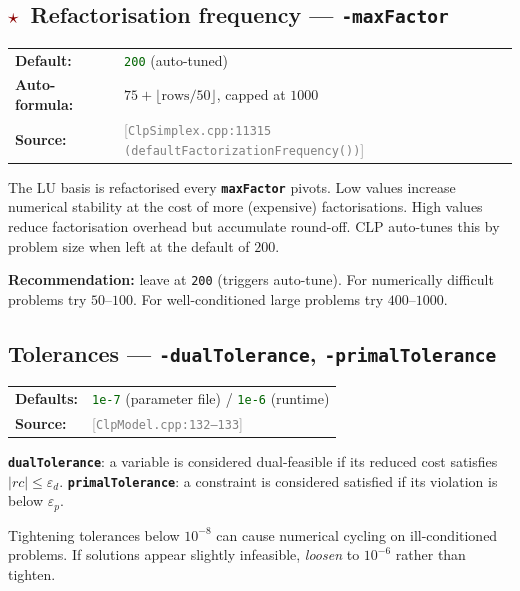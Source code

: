 \documentclass[11pt,a4paper]{article}
\newcommand{\param}[1]{\texttt{\textbf{#1}}}
\newcommand{\val}[1]{\texttt{#1}}
\newcommand{\src}[1]{\textcolor{gray}{\small[\texttt{#1}]}}
\newcommand{\default}[1]{\textcolor{darkgreen}{\texttt{#1}}}
\newcommand{\important}{\textcolor{darkred}{\textbf{$\star$}}}
\begin{document}
\subsection{\important\ Refactorisation frequency --- \param{-maxFactor}}

\begin{tabular}{@{}ll@{}}
  \textbf{Default:} & \default{200} (auto-tuned) \\
  \textbf{Auto-formula:} & $75 + \lfloor\text{rows}/50\rfloor$, capped at $1000$ \\
  \textbf{Source:}  & \src{ClpSimplex.cpp:11315 (defaultFactorizationFrequency())}
\end{tabular}

\medskip
The LU basis is refactorised every \param{maxFactor} pivots. Low values increase
numerical stability at the cost of more (expensive) factorisations. High values
reduce factorisation overhead but accumulate round-off.
CLP auto-tunes this by problem size when left at the default of $200$.

\begin{tipbox}
  \textbf{Recommendation:} leave at \val{200} (triggers auto-tune). For numerically
  difficult problems try $50$--$100$. For well-conditioned large problems try $400$--$1000$.
\end{tipbox}

\subsection{Tolerances --- \param{-dualTolerance}, \param{-primalTolerance}}

\begin{tabular}{@{}ll@{}}
  \textbf{Defaults:} & \default{1e-7} (parameter file) / \default{1e-6} (runtime) \\
  \textbf{Source:}  & \src{ClpModel.cpp:132--133}
\end{tabular}

\medskip
\param{dualTolerance}: a variable is considered dual-feasible if its reduced cost
satisfies $|rc| \le \varepsilon_d$. \param{primalTolerance}: a constraint is
considered satisfied if its violation is below $\varepsilon_p$.

\begin{warnbox}
  Tightening tolerances below $10^{-8}$ can cause numerical cycling on
  ill-conditioned problems. If solutions appear slightly infeasible, \emph{loosen}
  to $10^{-6}$ rather than tighten.
\end{warnbox}
\end{document}
